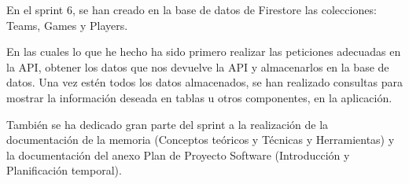 \hfill

En el sprint 6, se han creado en la base de datos de Firestore las colecciones: Teams, Games y Players. 

En las cuales lo que he hecho ha sido primero realizar las peticiones adecuadas en la API, obtener los datos que nos devuelve la API y almacenarlos en la base de datos. Una vez estén todos los datos almacenados, se han realizado consultas para mostrar la información deseada en tablas u otros componentes, en la aplicación.

También se ha dedicado gran parte del sprint a la realización de la documentación de la memoria (Conceptos teóricos y Técnicas y Herramientas) y la documentación del anexo Plan de Proyecto Software (Introducción y Planificación temporal).

\hfill


\clearpage

